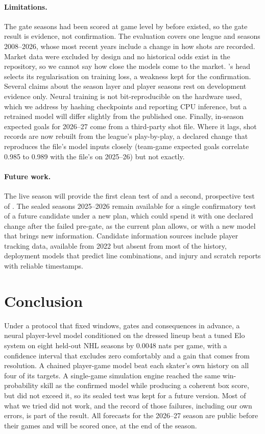 \paragraph{Limitations.}
The \neurhlG{} gate seasons had been scored at game level by \neurhlH{} before \neurhlG{}
existed, so the gate result is evidence, not confirmation. The evaluation
covers one league and seasons 2008--2026, whose most recent years include a
change in how shots are recorded. Market data were excluded by design and no
historical odds exist in the repository, so we cannot say how close the
models come to the market. \neurhlH{}'s head selects its regularisation on training
loss, a weakness kept for the confirmation. Several claims about the season
layer and player seasons rest on development evidence only. Neural training
is not bit-reproducible on the hardware used, which we address by hashing
checkpoints and reporting CPU inference, but a retrained model will differ
slightly from the published one. Finally, in-season expected goals for
2026--27 come from a third-party shot file. Where it lags, shot records are now
rebuilt from the league's play-by-play, a declared change that reproduces the
file's model inputs closely (team-game expected goals correlate 0.985 to 0.989
with the file's on 2025--26) but not exactly.

\paragraph{Future work.}
The live season will provide the first clean test of \neurhlG{} and a second,
prospective test of \neurhlH{}. The sealed seasons 2025--2026 remain available for a
single confirmatory test of a future \neurhlG{} candidate under a new plan, which
could spend it with one declared change after the failed pre-gate, as the
current plan allows, or with a new model that brings new information.
Candidate information sources include player tracking data, available from
2022 but absent from most of the history, deployment models that predict line
combinations, and injury and scratch reports with reliable timestamps.

\section{Conclusion}
\label{sec:conclusion}

Under a protocol that fixed windows, gates and consequences in advance, a
neural player-level model conditioned on the dressed lineup beat a tuned Elo
system on eight held-out NHL seasons by 0.0048 nats per game, with a
confidence interval that excludes zero comfortably and a gain that comes from
resolution. A chained player-game model beat each skater's own history on all
four of its targets. A single-game simulation engine reached the same
win-probability skill as the confirmed model while producing a coherent box
score, but did not exceed it, so its sealed test was kept for a future
version. Most of what we tried did not work, and the record of those failures,
including our own errors, is part of the result. All forecasts for the
2026--27 season are public before their games and will be scored once, at the
end of the season.

